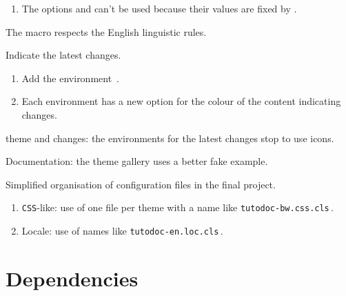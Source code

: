 {\begin{tdocnew}
\begin{enumerate}
		\item The  options  and  can't be used because their values are fixed by \thisproj.
	\end{enumerate}

	\item The macro  respects the English linguistic rules.

	\item Indicate the latest changes.
	\begin{enumerate}
		\item Add the environment \,.

		\item Each environment has a new option  for the colour of the content indicating changes.
	\end{enumerate}
\end{tdocnew}


\begin{tdocupdate}
	\item {} theme and changes: the environments for the latest changes stop to use icons.

	\item Documentation: the theme gallery uses a better fake example.
\end{tdocupdate}



\begin{tdoctech}
	\item Simplified organisation of configuration files in the final project.
	\begin{enumerate}
		\item \texttt{CSS}-like: use of one file per theme with a name like \texttt{tutodoc-bw.css.cls}\,.

		\item Locale: use of names like \texttt{tutodoc-en.loc.cls}\,.
	\end{enumerate}
\end{tdoctech}
}


\newpage
\tableofcontents
\newpage


\section{Dependencies}

